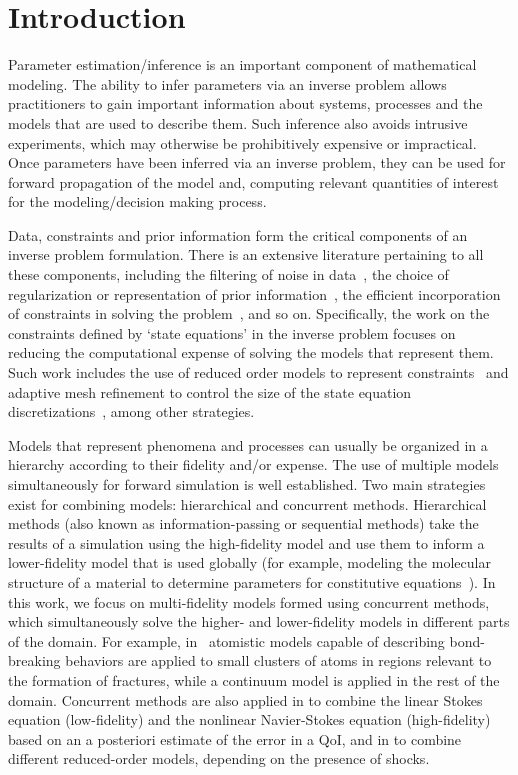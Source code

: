 \section{Introduction}

Parameter estimation/inference is an important component of mathematical modeling. The ability to infer parameters via an inverse problem allows practitioners to gain important information about systems, processes and the models that are used to describe them. Such inference also avoids intrusive experiments, which may otherwise be prohibitively expensive or impractical. Once parameters have been inferred via an inverse problem, they can be used for forward propagation of the model and, computing relevant quantities of interest for the modeling/decision making process.

Data, constraints and prior information form the critical components of an inverse problem formulation. There is an extensive literature pertaining to all these components, including the filtering of noise in data~\cite{}, the choice of regularization or representation of prior information~\cite{}, the efficient incorporation of constraints in solving the problem~\cite{}, and so on. Specifically, the work on the constraints defined by `state equations' in the inverse problem focuses on reducing the computational expense of solving the models that represent them. Such work includes the use of reduced order models to represent constraints~\cite{} and adaptive mesh refinement to control the size of the state equation discretizations~\cite{BecVex05,}, among other strategies.

Models that represent phenomena and processes can usually be organized in a hierarchy according to their fidelity and/or expense. The use of multiple models simultaneously for forward simulation is well established. Two main strategies exist for combining models: hierarchical and concurrent methods. Hierarchical methods (also known as information-passing or sequential methods) take the results of a simulation using the high-fidelity model and use them to inform a lower-fidelity model that is used globally (for example, modeling the molecular structure of a material to determine parameters for constitutive equations~\cite{Haoetal03}). In this work, we focus on multi-fidelity models formed using concurrent methods, which simultaneously solve the higher- and lower-fidelity models in different parts of the domain. For example, in~\cite{Khareetal08} atomistic models capable of describing bond-breaking behaviors are applied to small clusters of atoms in regions relevant to the formation of fractures, while a continuum model is applied in the rest of the domain. Concurrent methods are also applied in \cite{vanOpstaletal15} to combine the linear Stokes equation (low-fidelity) and the nonlinear Navier-Stokes equation (high-fidelity) based on an a posteriori estimate of the error in a QoI, and in \cite{LucKinBer02} to combine different reduced-order models, depending on the presence of shocks.

